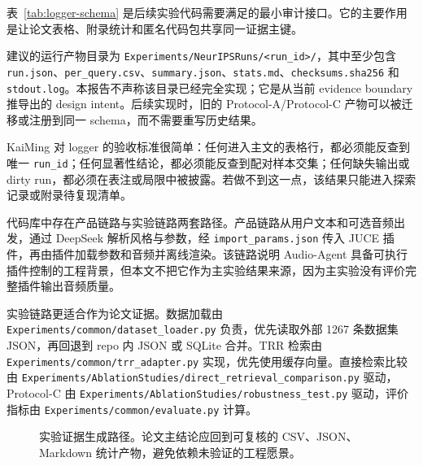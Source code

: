 表~\ref{tab:logger-schema} 是后续实验代码需要满足的最小审计接口。它的主要作用是让论文表格、附录统计和匿名代码包共享同一证据主键。

建议的运行产物目录为 \texttt{Experiments/NeurIPSRuns/<run\_id>/}，其中至少包含 \texttt{run.json}、\texttt{per\_query.csv}、\texttt{summary.json}、\texttt{stats.md}、\texttt{checksums.sha256} 和 \texttt{stdout.log}。本报告不声称该目录已经完全实现；它是从当前 evidence boundary 推导出的 design intent。后续实现时，旧的 Protocol-A/Protocol-C 产物可以被迁移或注册到同一 schema，而不需要重写历史结果。

KaiMing 对 logger 的验收标准很简单：任何进入主文的表格行，都必须能反查到唯一 \texttt{run\_id}；任何显著性结论，都必须能反查到配对样本交集；任何缺失输出或 dirty run，都必须在表注或局限中被披露。若做不到这一点，该结果只能进入探索记录或附录待复现清单。

代码库中存在产品链路与实验链路两套路径。产品链路从用户文本和可选音频出发，通过 DeepSeek 解析风格与参数，经 \texttt{import\_params.json} 传入 JUCE 插件，再由插件加载参数和音频并离线渲染。该链路说明 Audio-Agent 具备可执行插件控制的工程背景，但本文不把它作为主实验结果来源，因为主实验没有评价完整插件输出音频质量。

实验链路更适合作为论文证据。数据加载由 \texttt{Experiments/common/dataset\_loader.py} 负责，优先读取外部 1267 条数据集 JSON，再回退到 repo 内 JSON 或 SQLite 合并。TRR 检索由 \texttt{Experiments/common/trr\_adapter.py} 实现，优先使用缓存向量。直接检索比较由 \texttt{Experiments/AblationStudies/direct\_retrieval\_comparison.py} 驱动，Protocol-C 由 \texttt{Experiments/AblationStudies/robustness\_test.py} 驱动，评价指标由 \texttt{Experiments/common/evaluate.py} 计算。

\begin{figure}[H]
	\centering
	\caption{实验证据生成路径。论文主结论应回到可复核的 CSV、JSON、Markdown 统计产物，避免依赖未验证的工程愿景。}
	\label{fig:experiment-evidence-flow}
\end{figure}

